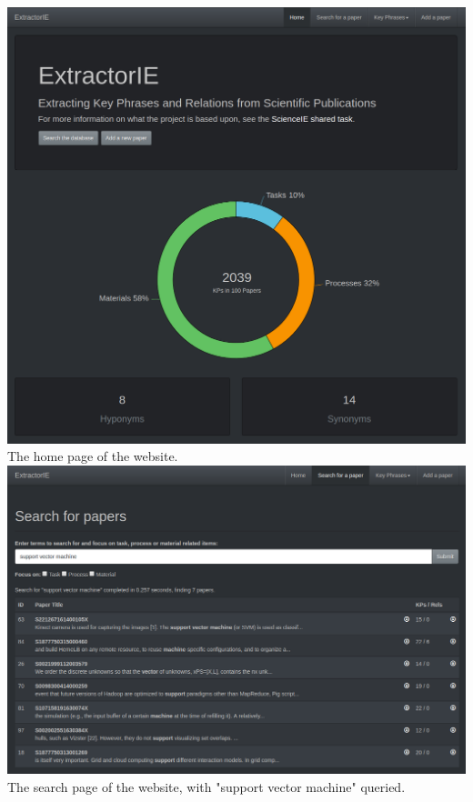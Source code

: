 \begin{appendices}
\begin{center}
	\includegraphics[width=14cm]{img/extractorie-home.png} \\
	\noindent The home page of the website. \\
	\includegraphics[width=\textwidth]{img/extractorie-search-supportvectormachine.png} \\
	\noindent The search page of the website, with "support vector machine" queried. \\

\end{center}
\end{appendices}
